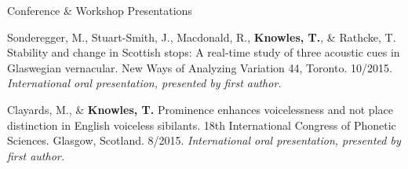\documentclass{resume} %
\begin{document}
\begin{rSection}{Conference \& Workshop Presentations}
%	
%	
%	
	
	Sonderegger, M., Stuart-Smith, J., Macdonald, R., {\bf Knowles, T.}, \& Rathcke, T. Stability and change in Scottish stops: A real-time study of three acoustic cues in Glaswegian vernacular. New Ways of Analyzing Variation 44, Toronto. 10/2015. \emph{International oral presentation, presented by first author.}
	
	Clayards, M., \& {\bf Knowles, T.} Prominence enhances voicelessness and not place distinction in English voiceless sibilants. 18th International Congress of Phonetic Sciences. Glasgow, Scotland. 8/2015. \emph{International oral presentation, presented by first author.}
	

\end{rSection}
\end{document}

